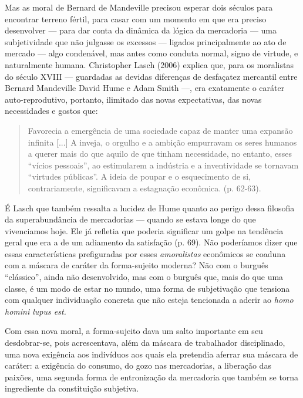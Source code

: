 Mas as moral de Bernard de Mandeville precisou esperar dois séculos para
encontrar terreno fértil, para casar com um momento em que era preciso
desenvolver --- para dar conta da dinâmica da lógica da mercadoria ---
uma subjetividade que não julgasse os excessos --- ligados
principalmente ao ato de mercado --- algo condenável, mas antes como
conduta normal, signo de virtude, e naturalmente humana. Christopher
Lasch (2006) explica que, para os moralistas do século XVIII ---
guardadas as devidas diferenças de desfaçatez mercantil entre Bernard
Mandeville David Hume e Adam Smith ---, era exatamente o caráter
auto-reprodutivo, portanto, ilimitado das novas expectativas, das novas
necessidades e gostos que:

\begin{quote}
Favorecia a emergência de uma sociedade capaz de manter uma expansão
infinita {[}...{]} A inveja, o orgulho e a ambição empurravam os seres
humanos a querer mais do que aquilo de que tinham necessidade, no
entanto, esses ``vícios pessoais'', ao estimularem a indústria e a
inventividade se tornavam ``virtudes públicas''. A ideia de poupar e o
esquecimento de si, contrariamente, significavam a estagnação econômica.
(p. 62-63).
\end{quote}

É Lasch que também ressalta a lucidez de Hume quanto ao perigo dessa
filosofia da superabundância de mercadorias --- quando se estava longe
do que vivenciamos hoje. Ele já refletia que poderia significar um golpe
na tendência geral que era a de um adiamento da satisfação (p. 69). Não
poderíamos dizer que essas características prefiguradas por esses
\emph{amoralistas} econômicos se coaduna com a máscara de caráter da
forma-sujeito moderna? Não com o burguês ``clássico'', ainda não
desenvolvido, mas com o burguês que, mais do que uma classe, é um modo
de estar no mundo, uma forma de subjetivação que tensiona com qualquer
individuação concreta que não esteja tencionada a aderir ao \emph{homo
homini lupus est.}

Com essa nova moral, a forma-sujeito dava um salto importante em seu
desdobrar-se, pois acrescentava, além da máscara de trabalhador
disciplinado, uma nova exigência aos indivíduos aos quais ela pretendia
aferrar sua máscara de caráter: a exigência do consumo, do gozo nas
mercadorias, a liberação das paixões, uma segunda forma de entronização
da mercadoria que também se torna ingrediente da constituição subjetiva.

